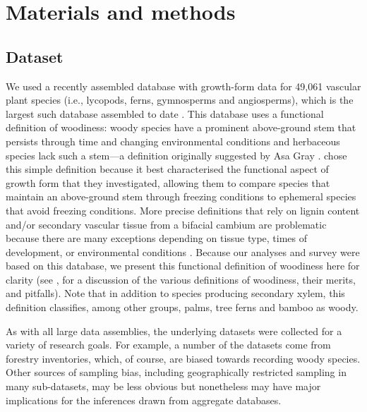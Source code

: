 \section{Materials and methods}

\subsection{Dataset}

We used a recently assembled database with growth-form data for
49,061 vascular plant species (i.e., lycopods, ferns, gymnosperms and
angiosperms), which is the largest such database assembled to date
\citep[][available on the Dryad data repository;]{ZanneDryad,Zanne}.
%
This database uses a functional definition of woodiness: woody species
have a prominent above-ground stem that persists through time and changing
environmental conditions and herbaceous species lack such a 
stem---a definition originally suggested by Asa Gray \citeyearpar{gray1887elements}. 
\citet{Zanne}
chose this simple definition because it best characterised the functional
aspect of growth form that they investigated, allowing them to compare 
species that maintain an above-ground stem through freezing conditions to 
ephemeral species that avoid freezing conditions.  More precise definitions 
that rely on lignin content and/or secondary vascular tissue from a bifacial
cambium are problematic because there are many exceptions depending on tissue 
type, times of development, or environmental conditions 
\citep{Groover2005, Spicer2010, Rowe2012}.  
Because our analyses and survey were based on this database, 
we present this functional definition of woodiness here for clarity 
(see \citealt{Zanne}, for a discussion of the various definitions of woodiness, 
their merits, and pitfalls).  Note that in addition to species producing
secondary xylem, this definition
classifies, among other groups, palms, tree ferns and bamboo as
woody.

As with all large data assemblies, the underlying datasets were collected 
for a variety of research goals. For example, a number of the datasets come
from forestry inventories, which, of course, are biased towards recording
woody species. Other sources of sampling bias, including geographically restricted sampling 
in many sub-datasets, may be less obvious but
nonetheless may have major implications for the inferences drawn from 
aggregate databases.


